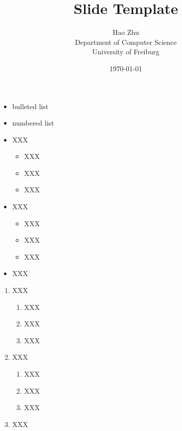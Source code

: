 \documentclass[landscape]{foils}
\title{Slide Template}
\author{
    Hao Zhu\\[10pt]
    Department of Computer Science\\
    University of Freiburg
}
\date{\today}
\begin{document}
\maketitle

\vfs
\begin{itemize}\itemsep=20pt
    \item bulleted list
    \item numbered list
\end{itemize}
\vfs

\begin{itemize}\itemsep=12pt
    \item XXX
        \vspace*{0.5ex}
        \begin{itemize}
        \item XXX
        \item XXX
        \item XXX
        \end{itemize}
    \item XXX
        \vspace*{0.5ex}
        \begin{itemize}
            \item XXX
            \item XXX
            \item XXX
        \end{itemize}
    \item XXX
\end{itemize}

\begin{enumerate}\itemsep=12pt
    \item XXX
        \vspace*{0.5ex}
        \begin{enumerate}
        \item XXX
        \item XXX
        \item XXX
        \end{enumerate}
    \item XXX
        \vspace*{0.5ex}
        \begin{enumerate}
            \item XXX
            \item XXX
            \item XXX
        \end{enumerate}
    \item XXX
\end{enumerate}
\end{document}
